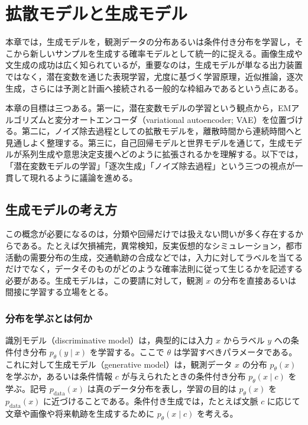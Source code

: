 \section{拡散モデルと生成モデル}

本章では，生成モデルを，観測データの分布あるいは条件付き分布を学習し，そこから新しいサンプルを生成する確率モデルとして統一的に捉える。画像生成や文生成の成功は広く知られているが，重要なのは，生成モデルが単なる出力装置ではなく，潜在変数を通じた表現学習，尤度に基づく学習原理，近似推論，逐次生成，さらには予測と計画へ接続される一般的な枠組みであるという点にある。

本章の目標は三つある。第一に，潜在変数モデルの学習という観点から，EMアルゴリズムと変分オートエンコーダ（variational autoencoder; VAE）を位置づける。第二に，ノイズ除去過程としての拡散モデルを，離散時間から連続時間へと見通しよく整理する。第三に，自己回帰モデルと世界モデルを通じて，生成モデルが系列生成や意思決定支援へどのように拡張されるかを理解する。以下では，「潜在変数モデルの学習」「逐次生成」「ノイズ除去過程」という三つの視点が一貫して現れるように議論を進める。

\subsection{生成モデルの考え方}

この概念が必要になるのは，分類や回帰だけでは扱えない問いが多く存在するからである。たとえば欠損補完，異常検知，反実仮想的なシミュレーション，都市活動の需要分布の生成，交通軌跡の合成などでは，入力に対してラベルを当てるだけでなく，データそのものがどのような確率法則に従って生じるかを記述する必要がある。生成モデルは，この要請に対して，観測 \(x\) の分布を直接あるいは間接に学習する立場をとる。

\subsubsection{分布を学ぶとは何か}

識別モデル（discriminative model）は，典型的には入力 \(x\) からラベル \(y\) への条件付き分布 \(p_{\theta}(y \mid x)\) を学習する。ここで \(\theta\) は学習すべきパラメータである。これに対して生成モデル（generative model）は，観測データ \(x\) の分布 \(p_{\theta}(x)\) を学ぶか，あるいは条件情報 \(c\) が与えられたときの条件付き分布 \(p_{\theta}(x \mid c)\) を学ぶ。記号 \(p_{\text{data}}(x)\) は真のデータ分布を表し，学習の目的は \(p_{\theta}(x)\) を \(p_{\text{data}}(x)\) に近づけることである。条件付き生成では，たとえば文脈 \(c\) に応じて文章や画像や将来軌跡を生成するために \(p_{\theta}(x \mid c)\) を考える。

